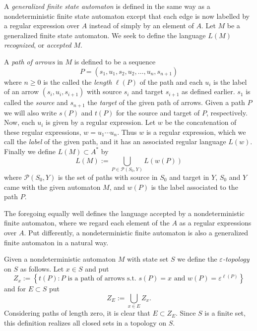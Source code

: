 \begin{defns} A \emph{generalized finite state automaton} is defined
    in the same way as a nondeterministic finite state automaton
    except that each edge is now labelled by a regular expression over
    $A$ instead of simply by an element of $A$.  Let $M$ be a
    generalized finite state automaton. We seek to define the language
    $L(M)$ \emph{recognized}, or \emph{accepted} $M$.

    A \emph{path of arrows} in $M$ is defined to be a sequence \[P =
    (s_1,u_1,s_2,u_2,\dots,u_n,s_{n+1})\] where $n\ge 0$ is the called
    the \emph{length} $\ell(P)$ of the path and each $u_i$ is the
    label of an arrow $(s_i,u_i,s_{i+1})$ with source $s_i$ and target
    $s_{i+1}$ as defined earlier. $s_1$ is called the \emph{source}
    and $s_{n+1}$ the \emph{target} of the given path of arrows. Given
    a path $P$ we will also write $s(P)$ and $t(P)$ for the source and
    target of $P$, respectively. Now, each $u_i$ is given by a regular
    expression. Let $w$ be the concatenation of these regular
    expressions, $w=u_1 \cdots u_n$.  Thus $w$ is a regular
    expression, which we call the \emph{label} of the given path, and
    it has an associated regular language $L(w)$. Finally we define
    $L(M) \subset A^*$ by \[L(M) := \bigcup_{P\in \mathscr{P}(S_0,Y)}
    L(w(P)) \] where $\mathscr{P}(S_0,Y)$ is the set of paths with
    source in $S_0$ and target in $Y$, $S_0$ and $Y$ came with the
    given automaton $M$, and $w(P)$ is the label associated to the
    path $P$.

    The foregoing equally well defines the language accepted by a
    nondeterministic finite automaton, where we regard each element of
    the $A$ as a regular expressions over $A$. Put differently, a
    nondeterministic finite automaton is also a generalized finite
    automaton in a natural way.
\end{defns}

\begin{defn} Given a nondeterministic automaton $M$ with state set $S$
    we define the \emph{$\varepsilon$-topology} on $S$ as follows.
    Let $x\in S$ and put \[Z_{x} := \left\{ t(P) : P \text{ is a path
    of arrows s.t. } s(P) = x \text{ and } w(P) =
    \varepsilon^{\ell(P)} \right\} \] and for $E \subset S$ put \[Z_E
    := \bigcup_{x\in E} Z_{x}.\] Considering paths of length zero, it
    is clear that $E \subset Z_E$. Since $S$ is a finite set, this
    definition realizes all closed sets in a topology on $S$.
\end{defn}

